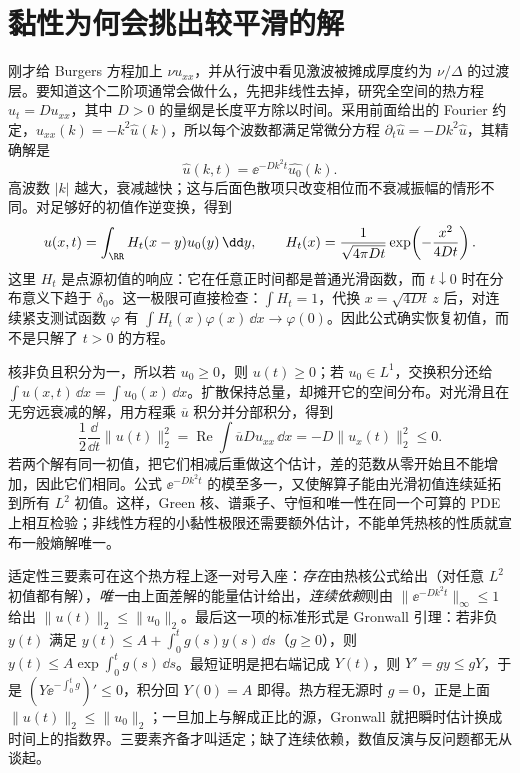 \section{黏性为何会挑出较平滑的解}

刚才给 Burgers 方程加上 \(\nu u_{xx}\)，并从行波中看见激波被摊成厚度约为 \(\nu/\Delta\) 的过渡层。要知道这个二阶项通常会做什么，先把非线性去掉，研究全空间的热方程 \(u_t=D u_{xx}\)，其中 \(D>0\) 的量纲是长度平方除以时间。采用前面给出的 Fourier 约定，\(\widehat{u_{xx}}(k)=-k^2\widehat u(k)\)，所以每个波数都满足常微分方程 \(\partial_t\widehat u=-Dk^2\widehat u\)，其精确解是
\[
 \widehat u(k,t)=\ee^{-Dk^2t}\widehat{u_0}(k).
\]
高波数 \(|k|\) 越大，衰减越快；这与后面色散项只改变相位而不衰减振幅的情形不同。对足够好的初值作逆变换，得到
\begin{equation}
 u(x,t)=\int_{\RR}H_t(x-y)u_0(y)\,\dd y,
 \qquad H_t(x)=\frac{1}{\sqrt{4\pi Dt}}\exp\!\left(-\frac{x^2}{4Dt}\right).
 \label{eq:math-heat-kernel}
\end{equation}
这里 \(H_t\) 是点源初值的响应：它在任意正时间都是普通光滑函数，而 \(t\downarrow0\) 时在分布意义下趋于 \(\delta_0\)。这一极限可直接检查：\(\int H_t=1\)，代换 \(x=\sqrt{4Dt}\,z\) 后，对连续紧支测试函数 \(\varphi\) 有 \(\int H_t(x)\varphi(x)\,\dd x\to\varphi(0)\)。因此公式确实恢复初值，而不是只解了 \(t>0\) 的方程。

核非负且积分为一，所以若 \(u_0\ge0\)，则 \(u(t)\ge0\)；若 \(u_0\in L^1\)，交换积分还给 \(\int u(x,t)\,\dd x=\int u_0(x)\,\dd x\)。扩散保持总量，却摊开它的空间分布。对光滑且在无穷远衰减的解，用方程乘 \(\overline u\) 积分并分部积分，得到
\[
 \frac12\frac{\dd}{\dd t}\|u(t)\|_2^2
 =\operatorname{Re}\int\overline u D u_{xx}\,\dd x
 =-D\|u_x(t)\|_2^2\le0.
\]
若两个解有同一初值，把它们相减后重做这个估计，差的范数从零开始且不能增加，因此它们相同。公式 \(\ee^{-Dk^2t}\) 的模至多一，又使解算子能由光滑初值连续延拓到所有 \(L^2\) 初值。这样，Green 核、谱乘子、守恒和唯一性在同一个可算的 PDE 上相互检验；非线性方程的小黏性极限还需要额外估计，不能单凭热核的性质就宣布一般熵解唯一。

适定性三要素可在这个热方程上逐一对号入座：\emph{存在}由热核公式给出（对任意 \(L^2\) 初值都有解），\emph{唯一}由上面差解的能量估计给出，\emph{连续依赖}则由 \(\|\ee^{-Dk^2t}\|_\infty\le1\) 给出 \(\|u(t)\|_2\le\|u_0\|_2\)。最后这一项的标准形式是 Gronwall 引理：若非负 \(y(t)\) 满足 \(y(t)\le A+\int_0^t g(s)y(s)\,\dd s\)（\(g\ge0\)），则 \(y(t)\le A\exp\!\int_0^t g(s)\,\dd s\)。最短证明是把右端记成 \(Y(t)\)，则 \(Y'=gy\le gY\)，于是 \((Y\ee^{-\int_0^t g})'\le0\)，积分回 \(Y(0)=A\) 即得。热方程无源时 \(g=0\)，正是上面 \(\|u(t)\|_2\le\|u_0\|_2\)；一旦加上与解成正比的源，Gronwall 就把瞬时估计换成时间上的指数界。三要素齐备才叫适定；缺了连续依赖，数值反演与反问题都无从谈起。
